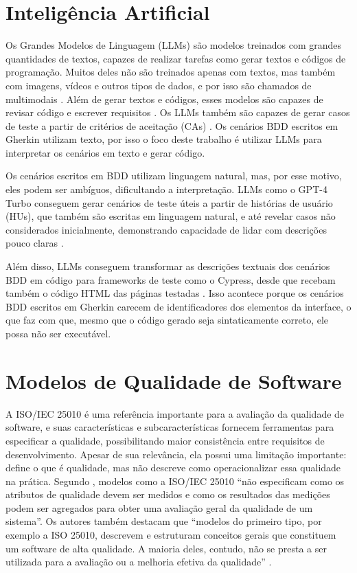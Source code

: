 \section{Inteligência Artificial}

Os Grandes Modelos de Linguagem (LLMs) são modelos treinados com grandes quantidades de textos, capazes de realizar tarefas como gerar textos e códigos de programação. Muitos deles não são treinados apenas com textos, mas também com imagens, vídeos e outros tipos de dados, e por isso são chamados de multimodais \cite{OpenAI2024GPT4o}. Além de gerar textos e códigos, esses modelos são capazes de revisar código e escrever requisitos \cite{Brockenbrough2025}. Os LLMs também são capazes de gerar casos de teste a partir de critérios de aceitação (CAs) \cite{Pysmennyi2025}. Os cenários BDD escritos em Gherkin utilizam texto, por isso o foco deste trabalho é utilizar LLMs para interpretar os cenários em texto e gerar código.

Os cenários escritos em BDD utilizam linguagem natural, mas, por esse motivo, eles podem ser ambíguos, dificultando a interpretação. LLMs como o GPT-4 Turbo conseguem gerar cenários de teste úteis a partir de histórias de usuário (HUs), que também são escritas em linguagem natural, e até revelar casos não considerados inicialmente, demonstrando capacidade de lidar com descrições pouco claras \cite{Ferreira2025}. 

Além disso, LLMs conseguem transformar as descrições textuais dos cenários BDD em código para frameworks de teste como o Cypress, desde que recebam também o código HTML das páginas testadas \cite{Ferreira2025}. Isso acontece porque os cenários BDD escritos em Gherkin carecem de identificadores dos elementos da interface, o que faz com que, mesmo que o código gerado seja sintaticamente correto, ele possa não ser executável.

\section{Modelos de Qualidade de Software}

A ISO/IEC 25010 é uma referência importante para a avaliação da qualidade de software, e suas características e subcaracterísticas fornecem ferramentas para especificar a qualidade, possibilitando maior consistência entre requisitos de desenvolvimento. Apesar de sua relevância, ela possui uma limitação importante: define o que é qualidade, mas não descreve como operacionalizar essa qualidade na prática. Segundo , modelos como a ISO/IEC 25010 “não especificam como os atributos de qualidade devem ser medidos e como os resultados das medições podem ser agregados para obter uma avaliação geral da qualidade de um sistema”. Os autores também destacam que “modelos do primeiro tipo, por exemplo a ISO 25010, descrevem e estruturam conceitos gerais que constituem um software de alta qualidade. A maioria deles, contudo, não se presta a ser utilizada para a avaliação ou a melhoria efetiva da qualidade” \cite[p.~1, tradução nossa]{Wagner2016}.

